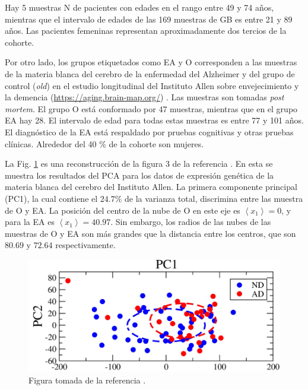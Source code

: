 Hay 5 muestras N de pacientes con edades en el rango entre 49 y 74 años, mientras que el intervalo de edades de las 169 muestras de GB es entre 21 y 89 años. Las pacientes femeninas representan aproximadamente dos tercios de la cohorte.

Por otro lado, los grupos etiquetados como EA y O corresponden a las muestras de la materia blanca del cerebro de la enfermedad del Alzheimer y del grupo de control (\textit{old}) en el estudio longitudinal del Instituto Allen sobre envejecimiento y la demencia (\href{https://aging.brain-map.org/}{https://aging.brain-map.org/}) \cite{Miller_2017}. Las muestras son tomadas \textit{post mortem}. El grupo O está conformado por 47 muestras, mientras que en el grupo EA hay 28. El intervalo de edad para todas estas muestras es entre 77 y 101 años. El diagnóstico de la EA está respaldado por pruebas cognitivas y otras pruebas clínicas. Alrededor del 40 \% de la cohorte son mujeres.

La Fig. \ref{fig:pcaotoad} es una reconstrucción de la figura 3 de la referencia \cite{Gonzalez_2021}. En esta se muestra los resultados del PCA para los datos de expresión genética de la materia blanca del cerebro del Instituto Allen. La primera componente principal (PC1), la cual contiene el $24.7 \%$ de la varianza total, discrimina entre las muestra de O y EA. La posición del centro de la nube de O en este eje es $\left\langle x_1 \right\rangle  = 0 $, y para la EA es $\left\langle x_1 \right\rangle = 40.97 $. Sin embargo, los radios de las nubes de las muestras de O y EA son más grandes que la distancia entre los centros, que son $80.69$ y $72.64$ respectivamente.

\begin{figure}[!htb]
	\centering
	\includegraphics[width=0.75\linewidth]{figures/pca_o_to_ad_1.png}
	\caption{Figura tomada de la referencia \cite{Gonzalez_2021}.}
	\label{fig:pcaotoad}
\end{figure}

